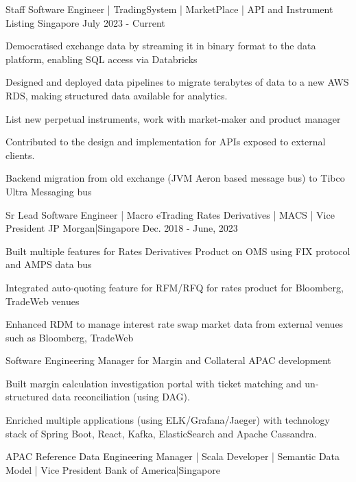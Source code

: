 \begin{cventries}
  {Staff Software Engineer | TradingSystem | MarketPlace | API and Instrument Listing }
  {Singapore}
  {July 2023 - Current}
  {
    \begin{cvitems}
      \item {Democratised exchange data by streaming it in binary format to the data platform, enabling SQL access via Databricks}
      \item {Designed and deployed data pipelines to migrate terabytes of data to a new AWS RDS, making structured data available for analytics.}
      \item {List new perpetual instruments, work with market-maker and product manager}
      \item {Contributed to the design and implementation for APIs exposed to external clients.}
      \item {Backend migration from old exchange (JVM Aeron based message bus) to Tibco Ultra Messaging bus}
    \end{cvitems}
  }
    {Sr Lead Software Engineer | Macro eTrading Rates Derivatives | MACS | Vice President }
    {JP Morgan|Singapore}
    {Dec. 2018 - June, 2023}
    {
      \begin{cvitems}
        \item {Built multiple features for Rates Derivatives Product on OMS using FIX protocol and AMPS data bus}
        \item {Integrated auto-quoting feature for RFM/RFQ for rates product for Bloomberg, TradeWeb venues}
        \item {Enhanced RDM to manage interest rate swap market data from external venues such as Bloomberg, TradeWeb}
        \item {Software Engineering Manager for Margin and Collateral APAC development}
        \item {Built margin calculation investigation portal with ticket matching and un-structured data reconciliation (using DAG).}
        \item {Enriched multiple applications (using ELK/Grafana/Jaeger) with technology stack of Spring Boot, React, Kafka, ElasticSearch and Apache Cassandra.}
      \end{cvitems}
    }
    {APAC Reference Data Engineering Manager | Scala Developer | Semantic Data Model | Vice President}
    {Bank of America|Singapore}

\end{cventries}
